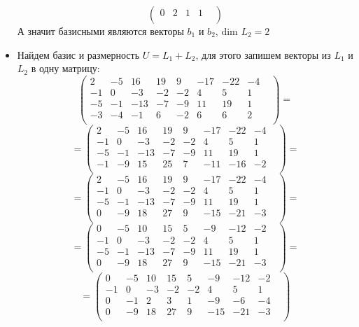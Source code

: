 \documentclass[a4paper,12pt]{article}
\begin{document}
\begin{itemize}
\begin{equation*}
\begin{pmatrix}
0 & 2 & 1 & 1 & \\
\end{pmatrix}
\end{equation*}
А значит базисными являются векторы $b_1$ и $b_2$, $\text{dim } L_2 = 2$
\item 
Найдем базис и размерность $U = L_1 + L_2$, для этого запишем векторы из $L_1$ и $L_2$ в одну матрицу:
\[
\begin{pmatrix}
2 & -5 & 16 & 19 & 9 & -17 & -22 & -4 & \\
-1 & 0 & -3 & -2 & -2 & 4 & 5 & 1 & \\
-5 & -1 & -13 & -7 & -9 & 11 & 19 & 1 & \\
-3 & -4 & -1 & 6 & -2 & 6 & 6 & 2 & \\
\end{pmatrix}
=
\]
\[
=
\begin{pmatrix}
2 & -5 & 16 & 19 & 9 & -17 & -22 & -4 & \\
-1 & 0 & -3 & -2 & -2 & 4 & 5 & 1 & \\
-5 & -1 & -13 & -7 & -9 & 11 & 19 & 1 & \\
-1 & -9 & 15 & 25 & 7 & -11 & -16 & -2 & \\
\end{pmatrix}
=
\]
\[
=
\begin{pmatrix}
2 & -5 & 16 & 19 & 9 & -17 & -22 & -4 & \\
-1 & 0 & -3 & -2 & -2 & 4 & 5 & 1 & \\
-5 & -1 & -13 & -7 & -9 & 11 & 19 & 1 & \\
0 & -9 & 18 & 27 & 9 & -15 & -21 & -3 & \\
\end{pmatrix}
=
\]
\[
=
\begin{pmatrix}
0 & -5 & 10 & 15 & 5 & -9 & -12 & -2 & \\
-1 & 0 & -3 & -2 & -2 & 4 & 5 & 1 & \\
-5 & -1 & -13 & -7 & -9 & 11 & 19 & 1 & \\
0 & -9 & 18 & 27 & 9 & -15 & -21 & -3 & \\
\end{pmatrix}
=
\]
\[
=
\begin{pmatrix}
0 & -5 & 10 & 15 & 5 & -9 & -12 & -2 & \\
-1 & 0 & -3 & -2 & -2 & 4 & 5 & 1 & \\
0 & -1 & 2 & 3 & 1 & -9 & -6 & -4 & \\
0 & -9 & 18 & 27 & 9 & -15 & -21 & -3 & \\
\end{pmatrix}
\]
\end{itemize}
\end{document}
